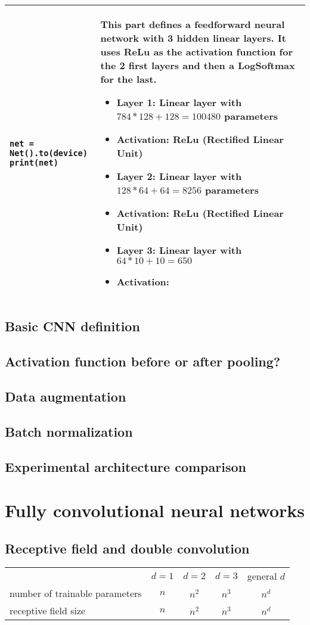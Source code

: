 \begin{longtable}{|m{}|m{}|}
\begin{lstlisting}
net = Net().to(device)
print(net)
\end{lstlisting} & This part defines a feedforward neural network with 3 hidden linear layers. It uses ReLu as the activation function for the 2 first layers and then a LogSoftmax for the last. 
\begin{itemize}
    \item Layer 1: Linear layer with \(784 * 128 + 128 = 100 480\) parameters
    \item Activation: ReLu (Rectified Linear Unit)
    \item Layer 2: Linear layer with \(128 * 64 + 64 = 8256\) parameters
    \item Activation: ReLu (Rectified Linear Unit)
    \item Layer 3: Linear layer with \(64 * 10 + 10 = 650\)
    \item Activation: 
\end{itemize}
\\ \hline


\end{longtable}





\subsection{Basic CNN definition}
\subsection{Activation function before or after pooling?}
\subsection{Data augmentation}
\subsection{Batch normalization}
\subsection{Experimental architecture comparison}
\section{Fully convolutional neural networks}
\subsection{Receptive field and double convolution}


\begin{center}
\begin{tabular}{lcccc}
     &  $d=1$ &  $d=2$ &  $d=3$ & general $d$\\
 number of trainable parameters   &$n$& $n^2$& $n^3$ & $n^d$\\
 receptive field size  &$n$& $n^2$& $n^3$ & $n^d$
\end{tabular}
    \end{center}